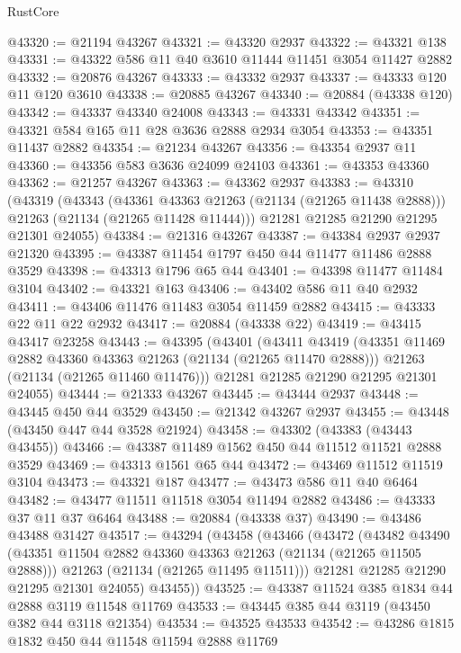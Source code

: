 \begin{lexlean}{RustCore}
\begin{coremodule}
@43320 := @21194 @43267
@43321 := @43320 @2937
@43322 := @43321 @138
@43331 := @43322 @586 @11 @40 @3610 @11444 @11451 @3054 @11427 @2882
@43332 := @20876 @43267
@43333 := @43332 @2937
@43337 := @43333 @120 @11 @120 @3610
@43338 := @20885 @43267
@43340 := @20884 (@43338 @120)
@43342 := @43337 @43340 @24008
@43343 := @43331 @43342
@43351 := @43321 @584 @165 @11 @28 @3636 @2888 @2934 @3054
@43353 := @43351 @11437 @2882
@43354 := @21234 @43267
@43356 := @43354 @2937 @11
@43360 := @43356 @583 @3636 @24099 @24103
@43361 := @43353 @43360
@43362 := @21257 @43267
@43363 := @43362 @2937
@43383 := @43310
    (@43319
      (@43343
        (@43361 @43363 @21263 (@21134 (@21265 @11438 @2888)))
        @21263
        (@21134 (@21265 @11428 @11444)))
      @21281
      @21285
      @21290
      @21295
      @21301
      @24055)
@43384 := @21316 @43267
@43387 := @43384 @2937 @2937 @21320
@43395 := @43387 @11454 @1797 @450 @44 @11477 @11486 @2888 @3529
@43398 := @43313 @1796 @65 @44
@43401 := @43398 @11477 @11484 @3104
@43402 := @43321 @163
@43406 := @43402 @586 @11 @40 @2932
@43411 := @43406 @11476 @11483 @3054 @11459 @2882
@43415 := @43333 @22 @11 @22 @2932
@43417 := @20884 (@43338 @22)
@43419 := @43415 @43417 @23258
@43443 := @43395
    (@43401
      (@43411
        @43419
        (@43351 @11469 @2882 @43360 @43363 @21263 (@21134 (@21265 @11470 @2888)))
        @21263
        (@21134 (@21265 @11460 @11476)))
      @21281
      @21285
      @21290
      @21295
      @21301
      @24055)
@43444 := @21333 @43267
@43445 := @43444 @2937
@43448 := @43445 @450 @44 @3529
@43450 := @21342 @43267 @2937
@43455 := @43448 (@43450 @447 @44 @3528 @21924)
@43458 := @43302 (@43383 (@43443 @43455))
@43466 := @43387 @11489 @1562 @450 @44 @11512 @11521 @2888 @3529
@43469 := @43313 @1561 @65 @44
@43472 := @43469 @11512 @11519 @3104
@43473 := @43321 @187
@43477 := @43473 @586 @11 @40 @6464
@43482 := @43477 @11511 @11518 @3054 @11494 @2882
@43486 := @43333 @37 @11 @37 @6464
@43488 := @20884 (@43338 @37)
@43490 := @43486 @43488 @31427
@43517 := @43294
    (@43458
      (@43466
        (@43472
          (@43482
            @43490
            (@43351 @11504 @2882 @43360 @43363 @21263 (@21134 (@21265 @11505 @2888)))
            @21263
            (@21134 (@21265 @11495 @11511)))
          @21281
          @21285
          @21290
          @21295
          @21301
          @24055)
        @43455))
@43525 := @43387 @11524 @385 @1834 @44 @2888 @3119 @11548 @11769
@43533 := @43445 @385 @44 @3119 (@43450 @382 @44 @3118 @21354)
@43534 := @43525 @43533
@43542 := @43286 @1815 @1832 @450 @44 @11548 @11594 @2888 @11769

\end{coremodule}
\end{lexlean}
